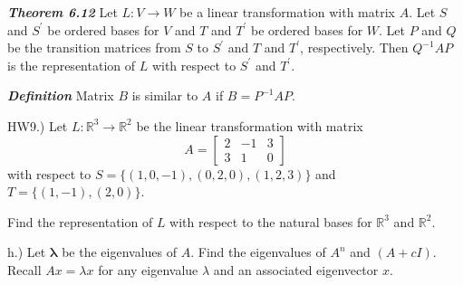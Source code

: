 \documentclass{article}
\begin{document}
\textbf{\emph{Theorem 6.12}} Let $L:V\rightarrow W$ be a linear transformation with matrix $A$. Let $S$ and $S^\prime$ be ordered bases for $V$ and $T$ and $T^\prime$ be ordered bases for $W$. Let $P$ and $Q$ be the transition matrices from $S$ to $S^\prime$ and $T$ and $T^\prime$, respectively. Then $Q^{-1}AP$ is the representation of $L$ with respect to $S^\prime$ and $T^\prime$. 
\medskip

\textbf{\emph{Definition}} Matrix $B$ is similar to $A$ if  $B = P^{-1}AP$. 


HW9.) Let $L:\mathbb{R}^3 \rightarrow \mathbb{R}^2$ be the linear transformation with matrix $$A = \left[ \begin{array}{ccc}

2 & -1 & 3\\
3 & 1 & 0
\end{array} \right]$$ with respect to $S = \{(1,0,-1), (0,2,0), (1,2,3) \}$ and $T=\{(1,-1), (2,0)\}$. 

Find the representation of $L$ with respect to the natural bases for $\mathbb{R}^3$ and $\mathbb{R}^2$. 


h.) Let $\mathbf{\lambda}$ be the eigenvalues of $A$. Find the eigenvalues of $A^n$ and $(A+cI)$. Recall $Ax = \lambda x$ for any eigenvalue $\lambda$ and an associated eigenvector $x$. 
\end{document}
